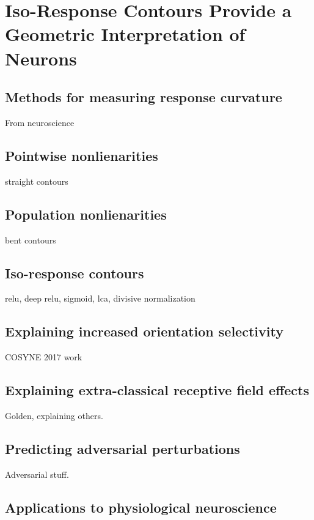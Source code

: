 \chapter{Iso-Response Contours Provide a Geometric Interpretation of Neurons}

\section{Methods for measuring response curvature}
From neuroscience

\section{Pointwise nonlienarities}
straight contours

\section{Population nonlienarities}
bent contours

\section{Iso-response contours}
relu, deep relu, sigmoid, lca, divisive normalization

\section{Explaining increased orientation selectivity}
COSYNE 2017 work

\section{Explaining extra-classical receptive field effects}
Golden, explaining others.

\section{Predicting adversarial perturbations}
Adversarial stuff.

\section{Applications to physiological neuroscience}